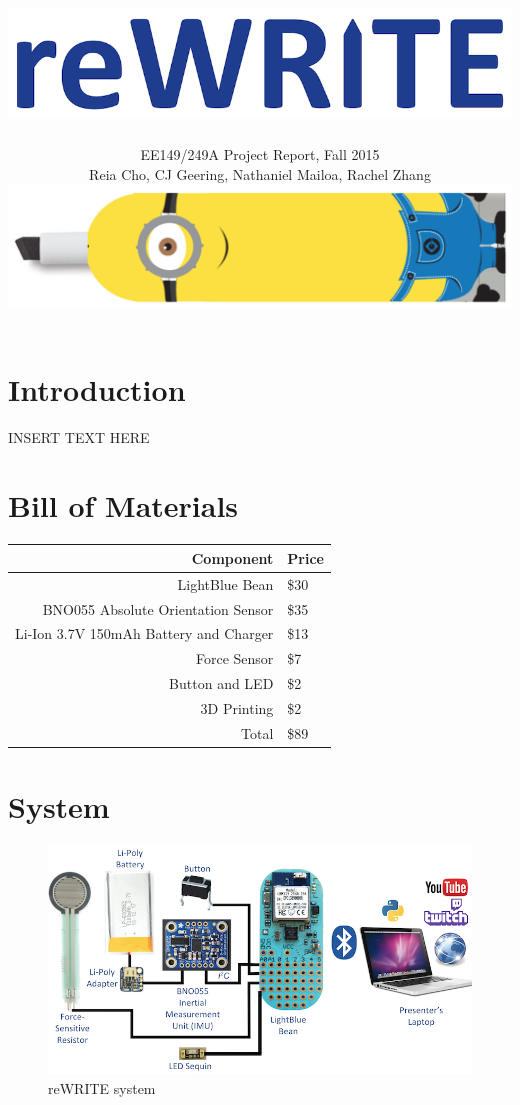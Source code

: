 \documentclass[12pt,journal]{IEEEtran}
\begin{document}
\title{\includegraphics[width=0.4\linewidth]{figures/rewrite}}

\author{EE149/249A Project Report, Fall 2015

Reia Cho, CJ Geering, Nathaniel Mailoa, Rachel Zhang

\includegraphics[width=0.45\linewidth]{figures/minion}}


\maketitle



\section{Introduction}
INSERT TEXT HERE

\section{Bill of Materials}
\centering
\begin{tabular}{r|l}
Component & Price \\
\hline
LightBlue Bean & \$30 \\
BNO055 Absolute Orientation Sensor & \$35 \\
Li-Ion 3.7V 150mAh Battery and Charger & \$13 \\
Force Sensor & \$7 \\
Button and LED & \$2 \\
3D Printing & \$2 \\
\hline
Total & \$89 \\
\end{tabular}

\section{System}

\begin{figure}[H]
  \centering
    \includegraphics[width=\linewidth]{figures/system}
  \caption{reWRITE system}
  \label{fig:system}
\end{figure}
\end{document}
